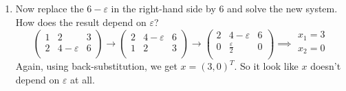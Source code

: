 \documentclass[11pt]{article}
\newcommand{\n}{\vspace{0.3cm}}
\begin{document}
\begin{enumerate}
\begin{enumerate}
		      \item Now replace the \(6-\varepsilon\) in the right-hand side by 6 and solve the new system.  How does the result depend on \(\varepsilon\)?
		            \[
			            \left(\begin{array}{rr|r}
					            1 & 2             & 3 \\
					            2 & 4-\varepsilon & 6 \\
				            \end{array}\right)
			            \to
			            \left(\begin{array}{rr|r}
					            2 & 4-\varepsilon & 6 \\
					            1 & 2             & 3 \\
				            \end{array}\right)
			            \to
			            \left(\begin{array}{rr|r}
					            2 & 4-\varepsilon      & 6 \\
					            0 & \tfrac\varepsilon2 & 0 \\
				            \end{array}\right)
			            \implies
			            \begin{array}{c}
				            x_1 = 3 \\
				            x_2 = 0 \\
			            \end{array}
		            \]
		            Again, using back-substitution, we get \(x = (3,0)^T\).  So it look like \(x\) doesn't depend on \(\varepsilon\) at all. \n


\end{enumerate}
\end{enumerate}
\end{document}
